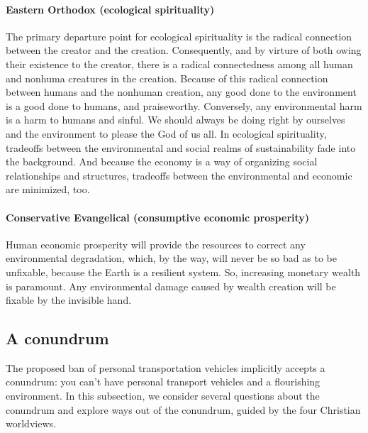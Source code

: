 \documentclass[12pt]{article}
\begin{document}
\paragraph{Eastern Orthodox (ecological spirituality)} 

The primary departure point for ecological spirituality is the radical connection between 
the creator and the creation.
Consequently, and by virture of both owing their existence to the creator, 
there is a radical connectedness among all human and nonhuma creatures in the creation.
Because of this radical connection between humans and the nonhuman creation, 
any good done to the environment is a good done to humans, 
and praiseworthy. 
Conversely, any environmental harm is a harm to humans and sinful. 
We should always be doing right by ourselves and the environment 
to please the God of us all.
In ecological spirituality, 
tradeoffs between the environmental and social realms of sustainability
fade into the background.
And because the economy is a way of organizing social relationships and structures,
tradeoffs between the environmental and economic are minimized, too.

\paragraph{Conservative Evangelical (consumptive economic prosperity)} 

Human economic prosperity will provide the resources 
to correct any environmental degradation, which, 
by the way, will never be so bad as to be unfixable, 
because the Earth is a resilient system. 
So, increasing monetary wealth is paramount. 
Any environmental damage caused by wealth creation will be fixable by the invisible hand. 


\subsection{A conundrum}
\label{sec:conundrum}

The proposed ban of personal transportation vehicles
implicitly accepts a conundrum: 
you can't have personal transport vehicles and a flourishing environment. 
In this subsection, we consider several questions about the conundrum and 
explore ways out of the conundrum,
guided by the four Christian worldviews.
\end{document}
